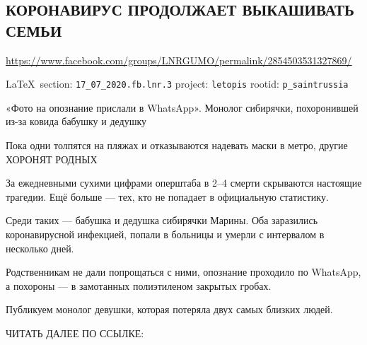  
 

\subsection{КОРОНАВИРУС ПРОДОЛЖАЕТ ВЫКАШИВАТЬ СЕМЬИ}
\url{https://www.facebook.com/groups/LNRGUMO/permalink/2854503531327869/}
  
\vspace{0.5cm}
{\small\LaTeX~section: \verb|17_07_2020.fb.lnr.3| project: \verb|letopis| rootid: \verb|p_saintrussia|}
\vspace{0.5cm}

«Фото на опознание прислали в WhatsApp».  Монолог сибирячки, похоронившей из-за
ковида бабушку и дедушку

Пока одни толпятся на пляжах и отказываются надевать маски в метро, другие
ХОРОНЯТ РОДНЫХ

За ежедневными сухими цифрами оперштаба в 2–4 смерти скрываются настоящие
трагедии.  Ещё больше — тех, кто не попадает в официальную статистику.

Среди таких — бабушка и дедушка сибирячки Марины.  Оба заразились
коронавирусной инфекцией, попали в больницы и умерли с интервалом в несколько
дней.

Родственникам не дали попрощаться с ними, опознание проходило по WhatsApp, а
похороны — в замотанных полиэтиленом закрытых гробах.

Публикуем монолог девушки, которая потеряла двух самых близких людей.

ЧИТАТЬ ДАЛЕЕ ПО ССЫЛКЕ: 

